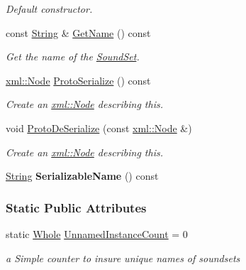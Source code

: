 \begin{DoxyCompactItemize}
\begin{DoxyCompactList}\small\item\em Default constructor. \item\end{DoxyCompactList}\item 
const \hyperlink{namespacephys_aa03900411993de7fbfec4789bc1d392e}{String} \& \hyperlink{classphys_1_1SoundSet_aa26c72befe51f514b24b652932ad1bc9}{GetName} () const 
\begin{DoxyCompactList}\small\item\em Get the name of the \hyperlink{classphys_1_1SoundSet}{SoundSet}. \item\end{DoxyCompactList}\item 
\hyperlink{classphys_1_1xml_1_1Node}{xml::Node} \hyperlink{classphys_1_1SoundSet_ab8202b748768b338505928cdece9d08c}{ProtoSerialize} () const 
\begin{DoxyCompactList}\small\item\em Create an \hyperlink{classphys_1_1xml_1_1Node}{xml::Node} describing this. \item\end{DoxyCompactList}\item 
void \hyperlink{classphys_1_1SoundSet_a5734b8cf5370036fea6d41b6659eca8e}{ProtoDeSerialize} (const \hyperlink{classphys_1_1xml_1_1Node}{xml::Node} \&)
\begin{DoxyCompactList}\small\item\em Create an \hyperlink{classphys_1_1xml_1_1Node}{xml::Node} describing this. \item\end{DoxyCompactList}\item 
\hypertarget{classphys_1_1SoundSet_a3cda7016b61a7da7f0c42e0bcc76d809}{
\hyperlink{namespacephys_aa03900411993de7fbfec4789bc1d392e}{String} {\bfseries SerializableName} () const }
\label{da/ddd/classphys_1_1SoundSet_a3cda7016b61a7da7f0c42e0bcc76d809}

\end{DoxyCompactItemize}
\subsubsection*{Static Public Attributes}
\begin{DoxyCompactItemize}
\item 
\hypertarget{classphys_1_1SoundSet_aaa6e07be3d7ce9b9b8b3dd86e8ca95e9}{
static \hyperlink{namespacephys_a460f6bc24c8dd347b05e0366ae34f34a}{Whole} \hyperlink{classphys_1_1SoundSet_aaa6e07be3d7ce9b9b8b3dd86e8ca95e9}{UnnamedInstanceCount} = 0}
\label{da/ddd/classphys_1_1SoundSet_aaa6e07be3d7ce9b9b8b3dd86e8ca95e9}

\begin{DoxyCompactList}\small\item\em a Simple counter to insure unique names of soundsets \item\end{DoxyCompactList}\end{DoxyCompactItemize}


